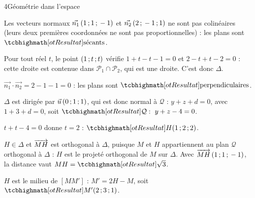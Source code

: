 \begin{corrigeBac}{4}{Géométrie dans l'espace}
\begin{questions}
  \item Les vecteurs normaux $\vec{n_1}\,(1\,{;}\,1\,{;}\,-1)$ et $\vec{n_2}\,(2\,{;}\,-1\,{;}\,1)$ ne sont pas colinéaires (leurs deux premières
    coordonnées ne sont pas proportionnelles) : les plans sont $\res{\text{sécants}}$. 
  \item Pour tout réel $t$, le point $(1\,{;}\, t\,{;}\, t)$ vérifie $1+t-t-1=0$ et $2-t+t-2=0$ : cette droite est contenue dans
    $\mathcal{P}_1\cap\mathcal{P}_2$, qui est une droite. C'est donc $\Delta$. 
  \item $\vec{n_1}\cdot\vec{n_2}=2-1-1=0$ : les plans sont $\res{\text{perpendiculaires}}$. 
  \item $\Delta$ est dirigée par $\vec u\,(0\,{;}\,1\,{;}\,1)$, qui est donc normal à $\mathcal{Q}$ : $y+z+d=0$, avec $1+3+d=0$, soit
    $\res{\mathcal{Q}:\ y+z-4=0}$. 
  \item $t+t-4=0$ donne $t=2$ : $\res{H(1\pv2\pv2)}$. 
  \item $H\in\Delta$ et $\overrightarrow{MH}$ est orthogonal à $\Delta$, puisque $M$ et $H$ appartiennent au plan $\mathcal{Q}$ orthogonal à $\Delta$ :
    $H$ est le projeté orthogonal de $M$ sur $\Delta$. Avec $\overrightarrow{MH}\,(1\,{;}\,1\,{;}\,-1)$, la distance vaut $MH=\res{\sqrt3}$. 
  \item $H$ est le milieu de $[MM']$ : $M'=2H-M$, soit $\res{M'(2\pv3\pv1)}$. 
\end{questions}
\end{corrigeBac}


